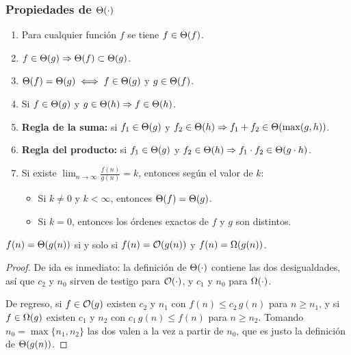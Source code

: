\documentclass[11pt,letterpaper]{article}
\begin{document}
\subsubsection*{Propiedades de $\Theta\!\left(\cdot\right)$}

\begin{enumerate}[itemsep=0.15em]
    \item Para cualquier función $f$ se tiene $f \in \Theta\!\left(f\right)$.
    \item $f \in \Theta\!\left(g\right) \Rightarrow \Theta\!\left(f\right) \subset \Theta\!\left(g\right)$.
    \item $\Theta\!\left(f\right) = \Theta\!\left(g\right) \iff f \in \Theta\!\left(g\right)$ y $g \in \Theta\!\left(f\right)$.
    \item Si $f \in \Theta\!\left(g\right)$ y $g \in \Theta\!\left(h\right) \Rightarrow
          f \in \Theta\!\left(h\right)$.
    \item \textbf{Regla de la suma:} si $f_1 \in \Theta\!\left(g\right)$ y
          $f_2 \in \Theta\!\left(h\right) \Rightarrow
          f_1 + f_2 \in \Theta\!\left(\max(g,h)\right)$.
    \item \textbf{Regla del producto:} si $f_1 \in \Theta\!\left(g\right)$ y
          $f_2 \in \Theta\!\left(h\right) \Rightarrow
          f_1 \cdot f_2 \in \Theta\!\left(g \cdot h\right)$.
    \item Si existe $\displaystyle\lim_{n \to \infty} \frac{f(n)}{g(n)}
          = k$, entonces según el valor de $k$:
          \begin{itemize}[itemsep=0.05em]
              \item Si $k \neq 0$ y $k < \infty$, entonces
                    $\Theta\!\left(f\right) = \Theta\!\left(g\right)$.
              \item Si $k = 0$, entonces los órdenes exactos de $f$ y
                    $g$ son distintos.
          \end{itemize}
\end{enumerate}

\begin{teorema}
    $f(n) = \Theta\!\left(g(n)\right)$ si y solo si $f(n) = \mathcal{O}\!\left(g(n)\right)$ y
    $f(n) = \Omega\!\left(g(n)\right)$.
\end{teorema}

\begin{proof}
    De ida es inmediato: la definición de $\Theta\!\left(\cdot\right)$ contiene las
    dos desigualdades, así que $c_2$ y $n_0$ sirven de testigo para
    $\mathcal{O}\!\left(\cdot\right)$, y $c_1$ y $n_0$ para $\Omega\!\left(\cdot\right)$.

    De regreso, si $f \in \mathcal{O}\!\left(g\right)$ existen $c_2$ y $n_1$ con
    $f(n) \leq c_2\,g(n)$ para $n \geq n_1$, y si $f \in \Omega\!\left(g\right)$
    existen $c_1$ y $n_2$ con $c_1\,g(n) \leq f(n)$ para $n \geq n_2$.
    Tomando $n_0 = \max\{n_1, n_2\}$ las dos valen a la vez a partir
    de $n_0$, que es justo la definición de $\Theta\!\left(g(n)\right)$. \qedhere
\end{proof}
\end{document}
